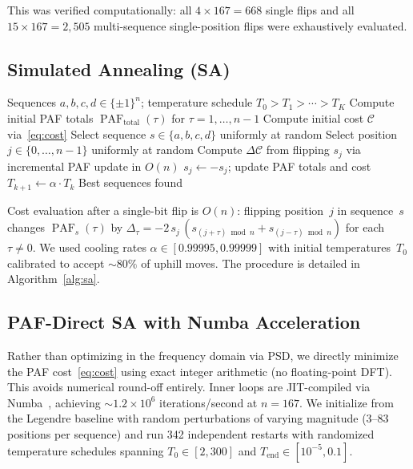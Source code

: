 \documentclass[11pt,a4paper]{article}
\DeclareMathOperator{\PAF}{PAF}
\begin{document}
This was verified computationally: all $4 \times 167 = 668$ single flips
and all $15 \times 167 = 2{,}505$ multi-sequence single-position
flips were exhaustively evaluated.

\subsection{Simulated Annealing (SA)}\label{sec:method:sa}

\begin{algorithm}[t]
\caption{Single-Flip Simulated Annealing for the GS--PAF Problem}
\label{alg:sa}
\begin{algorithmic}[1]
\REQUIRE Sequences $a,b,c,d \in \{\pm1\}^n$; temperature schedule $T_0 > T_1 > \cdots > T_K$
\STATE Compute initial PAF totals $\PAF_{\text{total}}(\tau)$ for $\tau = 1,\ldots,n{-}1$
\STATE Compute initial cost $\mathcal{C}$ via~\eqref{eq:cost}
    \STATE Select sequence $s \in \{a,b,c,d\}$ uniformly at random
    \STATE Select position $j \in \{0,\ldots,n{-}1\}$ uniformly at random
    \STATE Compute $\Delta\mathcal{C}$ from flipping $s_j$ via incremental PAF update in $O(n)$
      \STATE $s_j \leftarrow -s_j$; update PAF totals and cost
    \ENDIF
  \ENDFOR
  \STATE $T_{k+1} \leftarrow \alpha \cdot T_k$ 
\ENDFOR
\RETURN Best sequences found
\end{algorithmic}
\end{algorithm}

Cost evaluation after a single-bit flip is $O(n)$: flipping position~$j$
in sequence~$s$ changes $\PAF_s(\tau)$ by
$\Delta_\tau = -2\,s_j\,(s_{(j+\tau)\bmod n} + s_{(j-\tau)\bmod n})$
for each $\tau \neq 0$.  We used cooling rates $\alpha \in
[0.99995, 0.99999]$ with initial temperatures~$T_0$ calibrated to accept
$\sim\!80\%$ of uphill moves.  The procedure is detailed in
Algorithm~\ref{alg:sa}.

\subsection{PAF-Direct SA with Numba Acceleration}\label{sec:method:paf}

Rather than optimizing in the frequency domain via PSD, we directly
minimize the PAF cost~\eqref{eq:cost} using exact integer arithmetic (no
floating-point DFT).  This avoids numerical round-off entirely.  Inner
loops are JIT-compiled via Numba~\cite{lam2015numba}, achieving
$\sim\!1.2 \times 10^6$ iterations/second at $n = 167$.  We initialize
from the Legendre baseline with random perturbations of varying
magnitude ($3$--$83$ positions per sequence) and run 342 independent
restarts with randomized temperature schedules spanning
$T_0 \in [2, 300]$ and $T_{\text{end}} \in [10^{-5}, 0.1]$.
\end{document}
